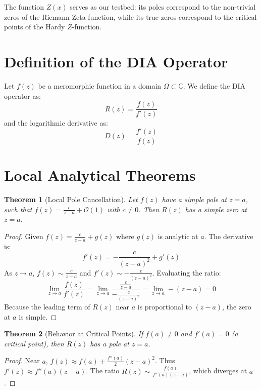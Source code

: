 \documentclass[12pt,a4paper]{article}
\newtheorem{theorem}{Theorem}
\begin{document}
The function \(Z(x)\) serves as our testbed: its poles correspond to the non-trivial zeros of the Riemann Zeta function, while its true zeros correspond to the critical points of the Hardy \(Z\)-function.

\section{Definition of the DIA Operator}
Let \(f(z)\) be a meromorphic function in a domain \(\Omega \subset \mathbb{C}\). We define the DIA operator as:
\begin{equation}
R(z) = \frac{f(z)}{f'(z)}
\end{equation}
and the logarithmic derivative as:
\begin{equation}
D(z) = \frac{f'(z)}{f(z)}
\end{equation}

\section{Local Analytical Theorems}
\begin{theorem}[Local Pole Cancellation]
Let \(f(z)\) have a simple pole at \(z=a\), such that \(f(z) = \frac{c}{z-a} + \mathcal{O}(1)\) with \(c \neq 0\). Then \(R(z)\) has a simple zero at \(z=a\).
\end{theorem}

\begin{proof}
Given \(f(z) = \frac{c}{z-a} + g(z)\) where \(g(z)\) is analytic at \(a\). The derivative is:
\begin{equation}
f'(z) = -\frac{c}{(z-a)^2} + g'(z)
\end{equation}
As \(z \to a\), \(f(z) \sim \frac{c}{z-a}\) and \(f'(z) \sim -\frac{c}{(z-a)^2}\). Evaluating the ratio:
\begin{equation}
\lim_{z \to a} \frac{f(z)}{f'(z)} = \lim_{z \to a} \frac{\frac{c}{z-a}}{-\frac{c}{(z-a)^2}} = \lim_{z \to a} -(z-a) = 0
\end{equation}
Because the leading term of \(R(z)\) near \(a\) is proportional to \((z-a)\), the zero at \(a\) is simple.
\end{proof}

\begin{theorem}[Behavior at Critical Points]
If \(f(a) \neq 0\) and \(f'(a) = 0\) (a critical point), then \(R(z)\) has a pole at \(z=a\).
\end{theorem}
\begin{proof}
Near \(a\), \(f(z) \approx f(a) + \frac{f''(a)}{2}(z-a)^2\). Thus \(f'(z) \approx f''(a)(z-a)\). The ratio \(R(z) \sim \frac{f(a)}{f''(a)(z-a)}\), which diverges at \(a\).
\end{proof}
\end{document}
